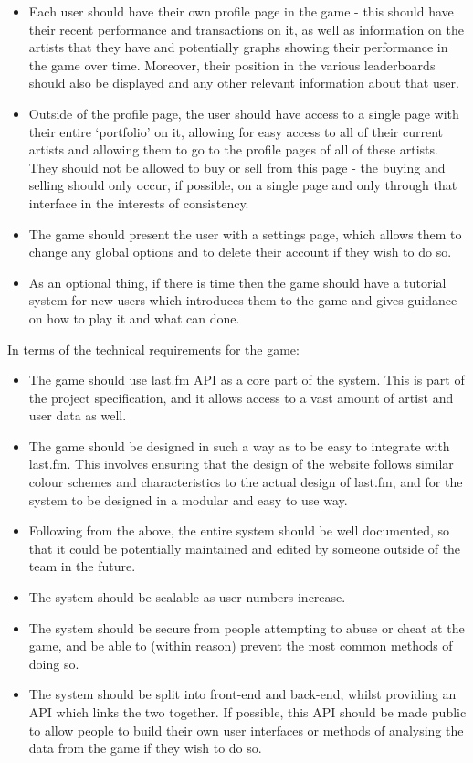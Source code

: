 \documentclass[a4paper,10pt,twoside]{article}
\begin{document}
\begin{itemize}
\item Each user should have their own profile page in the game - this should have their recent performance and transactions on it, as well as information on the artists that they have and potentially graphs showing their performance in the game over time. Moreover, their position in the various leaderboards should also be displayed and any other relevant information about that user.
\item Outside of the profile page, the user should have access to a single page with their entire `portfolio' on it, allowing for easy access to all of their current artists and allowing them to go to the profile pages of all of these artists. They should not be allowed to buy or sell from this page - the buying and selling should only occur, if possible, on a single page and only through that interface in the interests of consistency.
\item The game should present the user with a settings page, which allows them to change any global options and to delete their account if they wish to do so.
\item As an optional thing, if there is time then the game should have a tutorial system for new users which introduces them to the game and gives guidance on how to play it and what can done.
\end{itemize}

In terms of the technical requirements for the game:

\begin{itemize}
\item The game should use last.fm API as a core part of the system. This is part of the project specification, and it allows access to a vast amount of artist and user data as well.
\item The game should be designed in such a way as to be easy to integrate with last.fm. This involves ensuring that the design of the website follows similar colour schemes and characteristics to the actual design of last.fm, and for the system to be designed in a modular and easy to use way.
\item Following from the above, the entire system should be well documented, so that it could be potentially maintained and edited by someone outside of the team in the future.
\item The system should be scalable as user numbers increase.
\item The system should be secure from people attempting to abuse or cheat at the game, and be able to (within reason) prevent the most common methods of doing so.
\item The system should be split into front-end and back-end, whilst providing an API which links the two together. If possible, this API should be made public to allow people to build their own user interfaces or methods of analysing the data from the game if they wish to do so.
\end{itemize}
\end{document}
